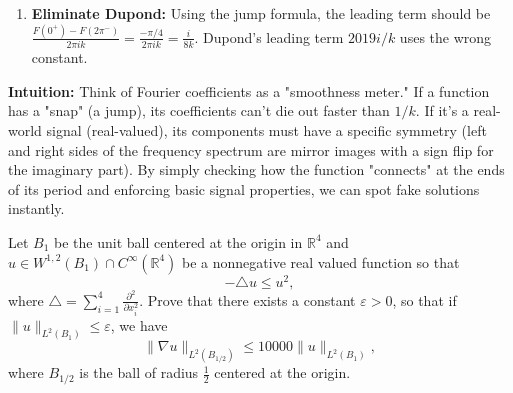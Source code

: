 \begin{solution}
\begin{enumerate}
    \item \textbf{Eliminate Dupond:} Using the jump formula, the leading term should be $\frac{F(0^+) - F(2\pi^-)}{2\pi i k} = \frac{-\pi/4}{2\pi i k} = \frac{i}{8k}$. Dupond's leading term $2019i/k$ uses the wrong constant.
\end{enumerate}

\bigskip

\textbf{Intuition:} 
Think of Fourier coefficients as a "smoothness meter." If a function has a "snap" (a jump), its coefficients can't die out faster than $1/k$. If it's a real-world signal (real-valued), its components must have a specific symmetry (left and right sides of the frequency spectrum are mirror images with a sign flip for the imaginary part). By simply checking how the function "connects" at the ends of its period and enforcing basic signal properties, we can spot fake solutions instantly.
\end{solution}

\begin{exercise}
\label{analysis:2020:3}
Let $B_1$ be the unit ball centered at the origin in $\mathbb{R}^4$ and $u\in W^{1,2}(B_1)\cap C^{\infty}(\mathbb{R}^4)$ be a nonnegative real valued function so that
\[
-\triangle u \leq u^2,
\]
where $\triangle = \sum_{i=1}^4\frac{\partial^2}{\partial x_i^2}$. Prove that there exists a constant $\varepsilon>0$, so that if $\|u\|_{L^2(B_1)}\leq\varepsilon$, we have
\[
\|\nabla u\|_{L^2(B_{1/2})} \leq 10000\|u\|_{L^2(B_1)},
\]
where $B_{1/2}$ is the ball of radius $\frac{1}{2}$ centered at the origin.

\end{exercise}

